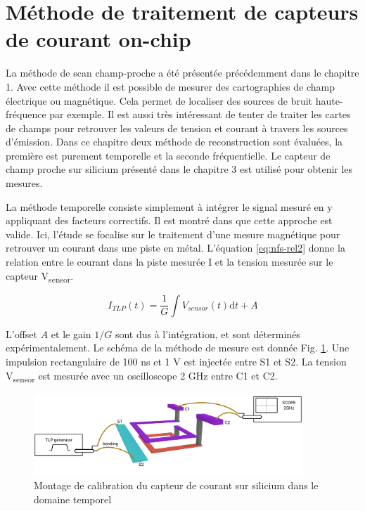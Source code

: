 \section{Méthode de traitement de capteurs de courant on-chip}

La méthode de scan champ-proche a été présentée précédemment dans le chapitre 1.
Avec cette méthode il est possible de mesurer des cartographies de champ électrique ou magnétique.
Cela permet de localiser des sources de bruit haute-fréquence par exemple.
Il est aussi très intéressant de tenter de traiter les cartes de champs pour retrouver les valeurs de tension et courant à travers les sources d'émission.
Dans ce chapitre deux méthode de reconstruction sont évaluées, la première est purement temporelle et la seconde fréquentielle.
Le capteur de champ proche sur silicium présenté dans le chapitre 3 est utilisé pour obtenir les mesures.

La méthode temporelle consiste simplement à intégrer le signal mesuré en y appliquant des facteurs correctifs.
Il est montré dans \cite{near-field-scan} que cette approche est valide.
Ici, l'étude se focalise sur le traitement d'une mesure magnétique pour retrouver un courant dans une piste en métal.
L'équation \ref{eq:nfs-rel2} donne la relation entre le courant dans la piste mesurée I et la tension mesurée sur le capteur V\textsubscript{sensor}.

\begin{equation}
I_{TLP}(t) = \frac{1}{G}\int V_{sensor}(t) \mathrm{d}t + A
\label{eq:nfs-rel2}
\end{equation}

L'offset $A$ et le gain $1/G$ sont dus à l'intégration, et sont déterminés expérimentalement.
Le schéma de la méthode de mesure est donnée Fig. \ref{fig:calibration-sensor}.
Une impulsion rectangulaire de 100 ns et 1 V est injectée entre S1 et S2.
La tension V\textsubscript{sensor} est mesurée avec un oscilloscope 2 GHz entre C1 et C2.

\begin{figure}[!h]
  \centering
  \includegraphics[width=0.9\textwidth]{src/1/figures/sensor_measurement_setup.pdf}
  \caption{Montage de calibration du capteur de courant sur silicium dans le domaine temporel}
  \label{fig:calibration-sensor}
\end{figure}

